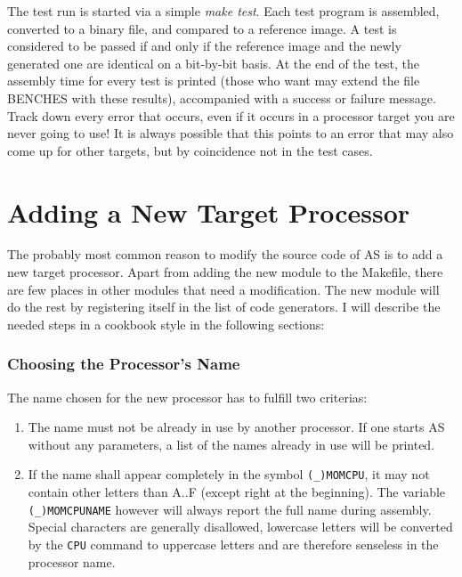 \documentclass[12pt,twoside]{report}
\newcommand{\tty}[1]{{\tt #1}}
\newcommand{\asname}{{AS}}
\newcommand{\predefsym}[1]{{\tt (\_)#1}}
\begin{document}
The test run is started via a simple {\em make test}.  Each test program
is assembled, converted to a binary file, and compared to a reference
image.  A test is considered to be passed if and only if the reference
image and the newly generated one are identical on a bit-by-bit basis.  At
the end of the test, the assembly time for every test is printed (those
who want may extend the file BENCHES with these results), accompanied with
a success or failure message.  Track down every error that occurs, even if
it occurs in a processor target you are never going to use!  It is always
possible that this points to an error that may also come up for other
targets, but by coincidence not in the test cases.


\section{Adding a New Target Processor}

The probably most common reason to modify the source code of \asname{} is to add
a new target processor.   Apart from adding the new module to the
Makefile, there are few places in other modules that need a modification.
The new module will do the rest by registering itself in the list of code
generators.  I will describe the needed steps in a cookbook style in the
following sections:

\subsubsection{Choosing the Processor's Name}

The name chosen for the new processor has to fulfill two criterias:
\begin{enumerate}
\item{The name must not be already in use by another processor.  If one
      starts \asname{} without any parameters, a list of the names already in
      use will be printed.}
\item{If the name shall appear completely in the symbol \predefsym{MOMCPU}, it may
      not contain other letters than A..F (except right at the
      beginning).  The variable \predefsym{MOMCPUNAME} however will always report
      the full name during assembly.  Special characters are generally
      disallowed, lowercase letters will be converted by the \tty{CPU}
      command to uppercase letters and are therefore senseless in the
      processor name.}
\end{enumerate}
\end{document}
